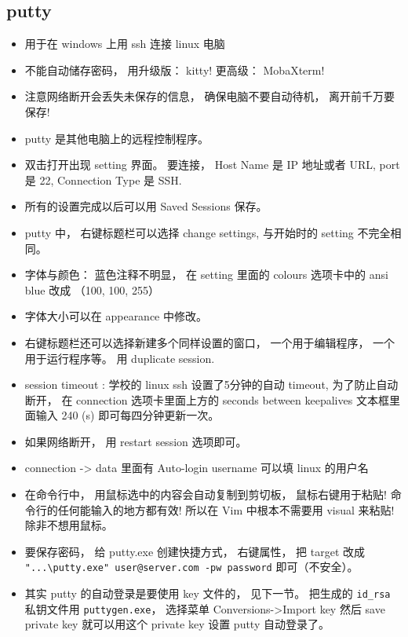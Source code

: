 \subsection{putty}
\begin{itemize}
\item 用于在 windows 上用 ssh 连接 linux 电脑
\item 不能自动储存密码， 用升级版： kitty! 更高级： MobaXterm!
\item 注意网络断开会丢失未保存的信息， 确保电脑不要自动待机， 离开前千万要保存!
\item putty 是其他电脑上的远程控制程序。
\item 双击打开出现 setting 界面。 要连接， Host Name 是 IP 地址或者 URL, port 是 22, Connection Type 是 SSH.
\item 所有的设置完成以后可以用 Saved Sessions 保存。
\item putty 中， 右键标题栏可以选择 change settings, 与开始时的 setting 不完全相同。
\item 字体与颜色： 蓝色注释不明显， 在 setting 里面的 colours 选项卡中的 ansi blue 改成 （100, 100, 255）
\item 字体大小可以在 appearance 中修改。
\item 右键标题栏还可以选择新建多个同样设置的窗口， 一个用于编辑程序， 一个用于运行程序等。 用 duplicate session.
\item session timeout : 学校的 linux ssh 设置了5分钟的自动 timeout, 为了防止自动断开， 在 connection 选项卡里面上方的 seconds between keepalives 文本框里面输入 240 (s) 即可每四分钟更新一次。
\item 如果网络断开， 用 restart session 选项即可。
\item connection -> data 里面有 Auto-login username 可以填 linux 的用户名
\item 在命令行中， 用鼠标选中的内容会自动复制到剪切板， 鼠标右键用于粘贴! 命令行的任何能输入的地方都有效! 所以在 Vim 中根本不需要用 visual 来粘贴! 除非不想用鼠标。
\item 要保存密码， 给 putty.exe 创建快捷方式， 右键属性， 把 target 改成 \verb|"...\putty.exe" user@server.com -pw password| 即可（不安全）。
\item 其实 putty 的自动登录是要使用 key 文件的， 见下一节。 把生成的 \verb|id_rsa| 私钥文件用 \verb|puttygen.exe|， 选择菜单 Conversions->Import key 然后 save private key 就可以用这个 private key 设置 putty 自动登录了。
\end{itemize}

